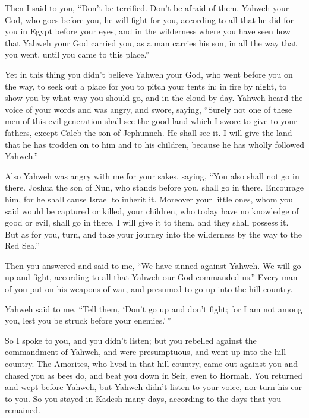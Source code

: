  Then I said to you, ``Don't be terrified. Don't be afraid
of them.  Yahweh your God, who goes before you, he will
fight for you, according to all that he did for you in Egypt before your
eyes,  and in the wilderness where you have seen how that
Yahweh your God carried you, as a man carries his son, in all the way
that you went, until you came to this place.''

 Yet in this thing you didn't believe Yahweh your God,
 who went before you on the way, to seek out a place for
you to pitch your tents in: in fire by night, to show you by what way
you should go, and in the cloud by day.  Yahweh heard the
voice of your words and was angry, and swore, saying, 
``Surely not one of these men of this evil generation shall see the good
land which I swore to give to your fathers,  except Caleb
the son of Jephunneh. He shall see it. I will give the land that he has
trodden on to him and to his children, because he has wholly followed
Yahweh.''

 Also Yahweh was angry with me for your sakes, saying,
``You also shall not go in there.  Joshua the son of Nun,
who stands before you, shall go in there. Encourage him, for he shall
cause Israel to inherit it.  Moreover your little ones,
whom you said would be captured or killed, your children, who today have
no knowledge of good or evil, shall go in there. I will give it to them,
and they shall possess it.  But as for you, turn, and take
your journey into the wilderness by the way to the Red Sea.''

 Then you answered and said to me, ``We have sinned against
Yahweh. We will go up and fight, according to all that Yahweh our God
commanded us.'' Every man of you put on his weapons of war, and presumed
to go up into the hill country.

 Yahweh said to me, ``Tell them, `Don't go up and don't
fight; for I am not among you, lest you be struck before your
enemies.'\,''

 So I spoke to you, and you didn't listen; but you rebelled
against the commandment of Yahweh, and were presumptuous, and went up
into the hill country.  The Amorites, who lived in that
hill country, came out against you and chased you as bees do, and beat
you down in Seir, even to Hormah.  You returned and wept
before Yahweh, but Yahweh didn't listen to your voice, nor turn his ear
to you.  So you stayed in Kadesh many days, according to
the days that you remained.

